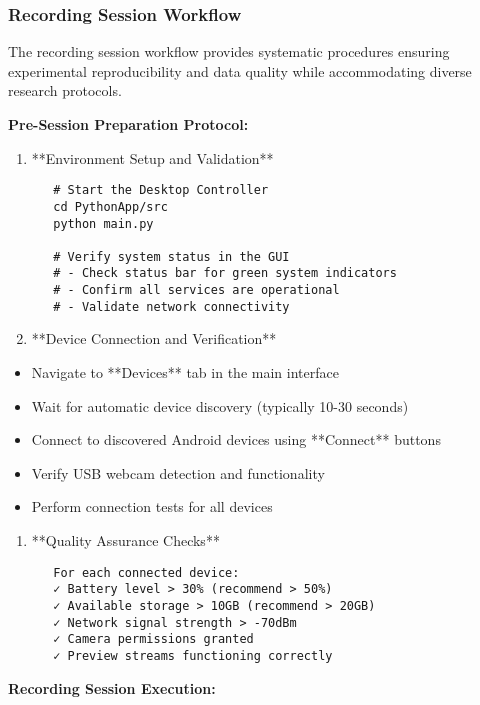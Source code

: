 \documentclass[11pt,a4paper]{article}
\begin{document}
\subsubsection{Recording Session Workflow}

The recording session workflow provides systematic procedures ensuring experimental reproducibility and data quality
while accommodating diverse research protocols.

\textbf{Pre-Session Preparation Protocol:}

\begin{enumerate}
\item **Environment Setup and Validation**
\begin{verbatim}
   # Start the Desktop Controller
   cd PythonApp/src
   python main.py

   # Verify system status in the GUI
   # - Check status bar for green system indicators
   # - Confirm all services are operational
   # - Validate network connectivity
\end{verbatim}

\item **Device Connection and Verification**
\end{enumerate}
\begin{itemize}
\item Navigate to **Devices** tab in the main interface
\item Wait for automatic device discovery (typically 10-30 seconds)
\item Connect to discovered Android devices using **Connect** buttons
\item Verify USB webcam detection and functionality
\item Perform connection tests for all devices

\end{itemize}
\begin{enumerate}
\item **Quality Assurance Checks**
\begin{verbatim}
   For each connected device:
   ✓ Battery level > 30% (recommend > 50%)
   ✓ Available storage > 10GB (recommend > 20GB)
   ✓ Network signal strength > -70dBm
   ✓ Camera permissions granted
   ✓ Preview streams functioning correctly
\end{verbatim}

\end{enumerate}
\textbf{Recording Session Execution:}
\end{document}
